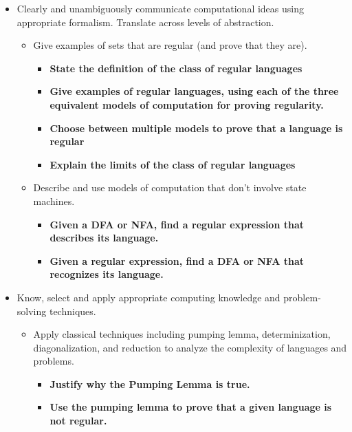 \begin{itemize}
\item Clearly and unambiguously communicate computational ideas using appropriate formalism. Translate across levels of abstraction.
\begin{itemize}
   \item Give examples of sets that are regular (and prove that they are).
   \begin{itemize}
      \item {\bf State the definition of the class of regular languages}
      \item {\bf Give examples of regular languages, using each of the three equivalent models of computation for proving regularity.}
      \item {\bf Choose between multiple models to prove that a language is regular}
      \item {\bf Explain the limits of the class of regular languages}
   \end{itemize}
   \item Describe and use models of computation that don't involve state machines.
   \begin{itemize}
      \item {\bf Given a DFA or NFA, find a regular expression that describes its language.}
      \item {\bf Given a regular expression, find a DFA or NFA that recognizes its language.}
   \end{itemize}
\end{itemize}

\item Know, select and apply appropriate computing knowledge and problem-solving techniques. 
\begin{itemize}
\item Apply classical techniques including pumping lemma, determinization, diagonalization, and reduction to analyze the complexity of languages and problems.
\begin{itemize}
    \item {\bf Justify why the Pumping Lemma is true.}
    \item {\bf Use the pumping lemma to prove that a given language is not regular.}
\end{itemize}
\end{itemize}


\end{itemize}
